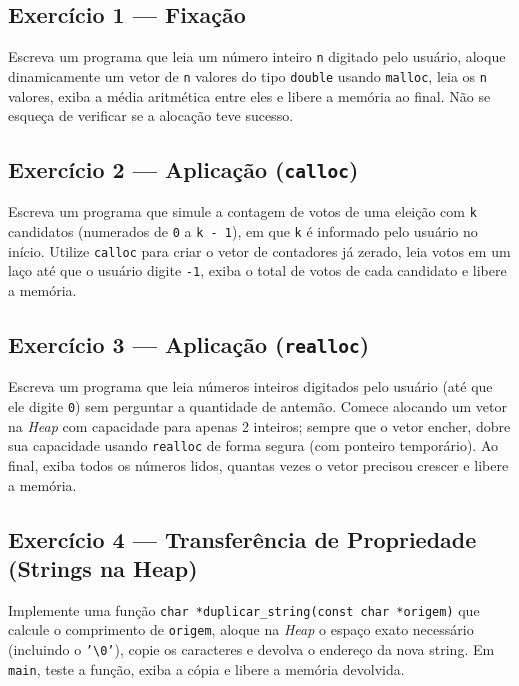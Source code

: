 \begin{exercicio}

\subsection*{Exercício 1 --- Fixação}
Escreva um programa que leia um número inteiro \texttt{n} digitado pelo usuário, aloque dinamicamente um vetor de \texttt{n} valores do tipo \texttt{double} usando \texttt{malloc}, leia os \texttt{n} valores, exiba a média aritmética entre eles e libere a memória ao final. Não se esqueça de verificar se a alocação teve sucesso.

\subsection*{Exercício 2 --- Aplicação (\texttt{calloc})}
Escreva um programa que simule a contagem de votos de uma eleição com \texttt{k} candidatos (numerados de \texttt{0} a \texttt{k - 1}), em que \texttt{k} é informado pelo usuário no início. Utilize \texttt{calloc} para criar o vetor de contadores já zerado, leia votos em um laço até que o usuário digite \texttt{-1}, exiba o total de votos de cada candidato e libere a memória.

\subsection*{Exercício 3 --- Aplicação (\texttt{realloc})}
Escreva um programa que leia números inteiros digitados pelo usuário (até que ele digite \texttt{0}) sem perguntar a quantidade de antemão. Comece alocando um vetor na \textit{Heap} com capacidade para apenas 2 inteiros; sempre que o vetor encher, dobre sua capacidade usando \texttt{realloc} de forma segura (com ponteiro temporário). Ao final, exiba todos os números lidos, quantas vezes o vetor precisou crescer e libere a memória.

\subsection*{Exercício 4 --- Transferência de Propriedade (Strings na Heap)}
Implemente uma função \texttt{char *duplicar\_string(const char *origem)} que calcule o comprimento de \texttt{origem}, aloque na \textit{Heap} o espaço exato necessário (incluindo o \texttt{'\textbackslash 0'}), copie os caracteres e devolva o endereço da nova string. Em \texttt{main}, teste a função, exiba a cópia e libere a memória devolvida.


\end{exercicio}

